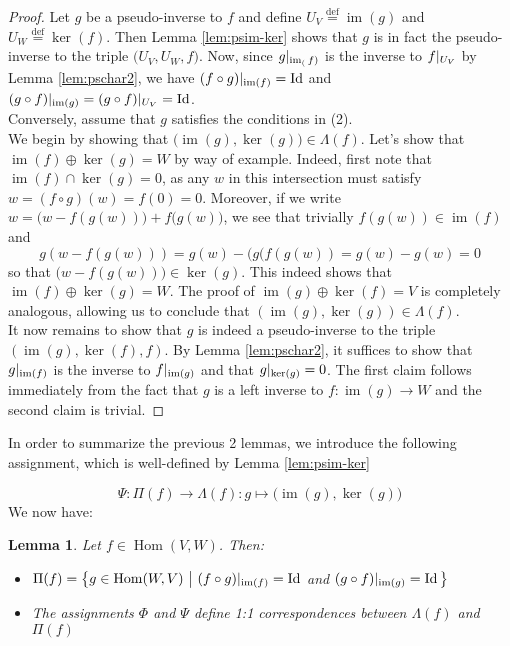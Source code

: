 \documentclass{book}
\theoremstyle{plain}
\newtheorem{lemma}[corollary]{Lemma}
\theoremstyle{definition}
\newcommand{\define}{\stackrel{\operatorname{def}}{=}}
\newcommand{\ds}{\oplus}
\newcommand{\fun}{\mapsto}
\DeclareMathOperator{\Hom}{Hom}
\DeclareMathOperator{\Id}{Id}
\DeclareMathOperator{\im}{im}
\newcommand{\mor}{\longrightarrow}
\begin{document}
\begin{proof}
	Let $g$ be a pseudo-inverse to $f$ and define $U_V\define\im(g)$ and $U_W\define\ker(f)$. Then Lemma \ref{lem:psim-ker} shows that $g$ is in fact the pseudo-inverse to the triple $\big(U_V,U_W,f\big)$. Now, since $g\arrowvert_{\im_(f)}$ is the inverse to $f\arrowvert_{U_V}$ by Lemma \ref{lem:pschar2}, we have $(f \circ g)\arrowvert_{\im(f)}=\Id$ and $(g \circ f)\arrowvert_{\im(g)}=(g \circ f)\arrowvert_{U_V}=\Id$.\\
	Conversely, assume that $g$ satisfies the conditions in (2).\\
	We begin by showing that $\big(\im(g),\ker(g)\big) \in \Lambda(f)$. Let's show  that $\im(f)\ds \ker(g)=W$ by way of example. Indeed, first note that $\im(f)\cap \ker(g)=0$, as any $w$ in this intersection must satisfy $w=(f\circ g)(w)=f(0)=0$. Moreover, if we write $w=\big(w-f( g(w))\big)+f ( g(w)\big)$, we see that trivially $f(g(w))\in \im (f)$ and \[
	g(w-f(g(w)))=g(w)-(g(f(g(w))=g(w)-g(w)=0
	\]
	so that $\big(w-f(g(w))\big) \in \ker(g)$. This indeed shows that $\im(f)\ds \ker(g)=W$. The proof of $\im(g)\ds \ker(f)=V$ is completely analogous, allowing us to conclude that $(\im(g),\ker(g))\in \Lambda(f)$.\\
	It now remains to show that $g$ is indeed a pseudo-inverse to the triple $(\im(g),\ker(f),f)$. By Lemma \ref{lem:pschar2}, it suffices to show that $g\arrowvert_{\im(f)}$ is the inverse to $f\arrowvert_{\im(g)}$ and that $g\arrowvert_{\ker(g)}=0$. The first claim follows immediately from the fact that $g$ is a left inverse to $f:\im(g)\mor W$ and the second claim is trivial.
\end{proof}

\noindent In order to summarize the previous 2 lemmas, we introduce the following assignment, which is well-defined by Lemma \ref{lem:psim-ker}

\[
\Psi: \Pi(f)\mor \Lambda(f): g\fun \big(\im(g),\ker(g)\big)
\]
We now have:
\begin{lemma}\label{lem:psinverses}
	Let $f \in \Hom(V,W)$. Then:
	\begin{itemize}
		\item 
		$\Pi(f)=\big\{ g \in \Hom(W,V)\,\,\big\vert\,\, (f\circ g)\arrowvert_{\im(f)}=\Id$ \textrm{ and } $(g\circ f)\arrowvert_{\im(g)}=\Id \big\} $
		\item The assignments $\Phi$ and $\Psi$ define 1:1 correspondences between $\Lambda(f)$ and $\Pi(f)$
	\end{itemize}
\end{lemma}
\end{document}
